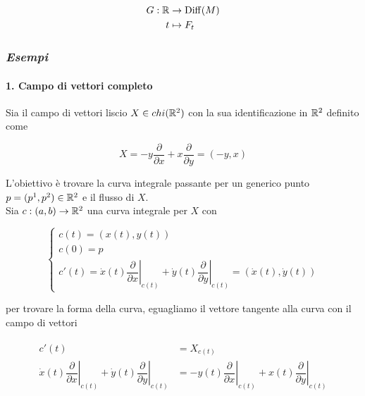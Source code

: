 \begin{align}
	\begin{split}
		G : \mathbb{R} &\to \operatorname{Diff}(M)\\
		t &\mapsto F_{t}
	\end{split}
\end{align}

\subsubsection{\textit{Esempi}}

\paragraph{1. Campo di vettori completo}

Sia il campo di vettori liscio $ X \in chi(\mathbb{R}^{2}) $ con la sua identificazione in $ \mathbb{R}^{2} $ definito come

\begin{equation}
	X = - y \dfrac{\partial}{\partial x} + x \dfrac{\partial}{\partial y} = (-y, x)
\end{equation}

L'obiettivo è trovare la curva integrale passante per un generico punto $ p = (p^{1},p^{2}) \in \mathbb{R}^{2} $ e il flusso di $ X $.\\
Sia $ c : (a,b) \to \mathbb{R}^{2} $ una curva integrale per $ X $ con

\begin{equation}
	\begin{cases}
		c(t) = (x(t),y(t))\\
		c(0) = p\\
		c'(t) = \dot{x}(t) \left. \dfrac{\partial}{\partial x} \right|_{c(t)} + \dot{y}(t) \left. \dfrac{\partial}{\partial y} \right|_{c(t)} = (\dot{x}(t),\dot{y}(t))		
	\end{cases}
\end{equation}

per trovare la forma della curva, eguagliamo il vettore tangente alla curva con il campo di vettori

\begin{align}
	\begin{split}
		c'(t) &= X_{c(t)}\\
		\dot{x}(t) \left. \dfrac{\partial}{\partial x} \right|_{c(t)} + \dot{y}(t) \left. \dfrac{\partial}{\partial y} \right|_{c(t)} &= - y(t) \left. \dfrac{\partial}{\partial x} \right|_{c(t)} + x(t) \left. \dfrac{\partial}{\partial y} \right|_{c(t)}
	\end{split}
\end{align}

